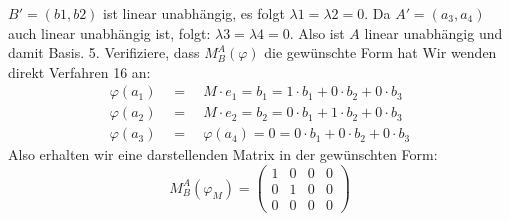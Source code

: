 \documentclass{article}
\newcommand{\eq}{\mathbb{\quad = \quad}}
\newcommand{\legs}[2]{\left(\begin{array}{#1}#2\end{array}\right)}
\begin{document}
$B' = (b1,b2)$
 ist linear unabhängig, es folgt
 $ \lambda1 = \lambda2 = 0$.
 Da
 $A' = (a_3,a_4)$
 auch linear unabhängig ist, folgt: 
 $\lambda3 = \lambda4 = 0$.
 Also ist $A$ linear unabhängig und damit Basis.
5. Verifiziere, dass 
$M^A_B(\varphi)$
 die gewünschte Form hat
Wir wenden direkt Verfahren 16 an:
\begin{align*}
    \varphi(a_1) \eq M \cdot e_1 = b_1 = 1 \cdot b_1 +0 \cdot b_2 +0 \cdot b_3 \\
    \varphi(a_2) \eq M \cdot e_2 = b_2 = 0 \cdot b_1 +1 \cdot b_2 +0 \cdot b_3 \\
    \varphi(a_3) \eq \varphi(a_4) = 0 = 0 \cdot b_1 +0 \cdot b_2 +0 \cdot b_3
\end{align*}
Also erhalten wir eine darstellenden Matrix in der gewünschten Form:
\[
    M^A_B
    (\varphi_M ) =
    \legs{cccc}{
    1 & 0 & 0 & 0 \\
    0 & 1 & 0 & 0 \\
    0 & 0 & 0 & 0
    }
\]
\end{document}
